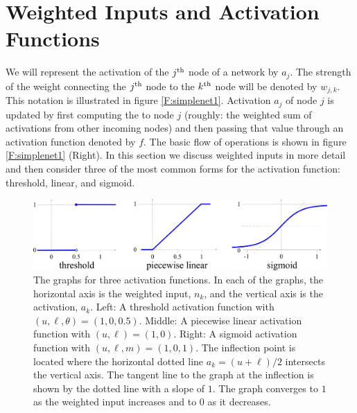 \section{Weighted Inputs and Activation Functions}

 We will represent the activation of the $j^{\rm th}$ node of a network by $a_j$. The 
strength of the weight connecting the $j^{\rm th}$ node to the $k^{\rm th}$  node will be denoted by $w_{j,k}$. This notation is illustrated in figure \ref{F:simplenet1}. Activation $a_j$ of node $j$ is updated by first 
computing the  to node $j$  (roughly: the weighted sum of activations from other incoming nodes) and then passing that value through an activation function denoted by $f$. The basic flow of operations is shown in figure \ref{F:simplenet1} (Right). In this section we discuss weighted inputs in more detail and then consider three of the most common forms for the activation function: threshold, 
linear, and sigmoid.

\begin{figure}[h]
\centering
\includegraphics[scale=0.130]{./images/graph_binary.pdf}
\caption[Scott Hotton.]{The graphs for three activation functions. In each of the graphs, the 
horizontal axis is the weighted input, $n_k$, and the vertical axis is the 
activation, $a_k$. Left: A threshold activation function with $(u,\ell,\theta)
=(1,0,0.5)$. Middle: A piecewise linear activation function with 
$(u,\ell)=(1,0)$. Right: A sigmoid activation function with $(u,\ell,m) = 
(1,0,1)$. The inflection point is located where the horizontal dotted line 
$a_k = (u+\ell)/2$ intersects the vertical axis. The tangent line to the graph 
at the inflection is shown by the dotted line with a slope of $1$. The graph 
converges to $1$ as the weighted input increases and to $0$ as it decreases.}
\label{activationFunctions}
\end{figure}

